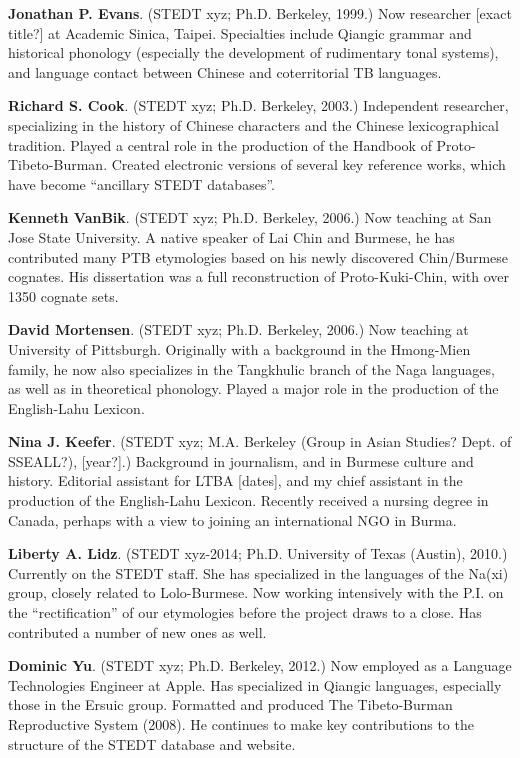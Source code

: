 \textbf{Jonathan P. Evans}. (STEDT xyz; Ph.D. Berkeley, 1999.) Now researcher [exact title?] at Academic Sinica, Taipei. Specialties include Qiangic grammar and historical phonology (especially the development of rudimentary tonal systems), and language contact between Chinese and coterritorial TB languages.

\textbf{Richard S. Cook}. (STEDT xyz; Ph.D. Berkeley, 2003.) Independent researcher, specializing in the history of Chinese characters and the Chinese lexicographical tradition. Played a central role in the production of the Handbook of Proto-Tibeto-Burman. Created electronic versions of several key reference works, which have become “ancillary STEDT databases”.

\textbf{Kenneth VanBik}. (STEDT xyz; Ph.D. Berkeley, 2006.) Now teaching at San Jose State University. A native speaker of Lai Chin and Burmese, he has contributed many PTB etymologies based on his newly discovered Chin/Burmese cognates. His dissertation was a full reconstruction of Proto-Kuki-Chin, with over 1350 cognate sets.

\textbf{David Mortensen}. (STEDT xyz; Ph.D. Berkeley, 2006.) Now teaching at University of Pittsburgh. Originally with a background in the Hmong-Mien family, he now also specializes in the Tangkhulic branch of the Naga languages, as well as in theoretical phonology. Played a major role in the production of the English-Lahu Lexicon.

\textbf{Nina J. Keefer}. (STEDT xyz; M.A. Berkeley (Group in Asian Studies? Dept. of SSEALL?), [year?].) Background in journalism, and in Burmese culture and history. Editorial assistant for LTBA [dates], and my chief assistant in the production of the English-Lahu Lexicon. Recently received a nursing degree in Canada, perhaps with a view to joining an international NGO in Burma.

\textbf{Liberty A. Lidz}. (STEDT xyz-2014; Ph.D. University of Texas (Austin), 2010.) Currently on the STEDT staff. She has specialized in the languages of the Na(xi) group, closely related to Lolo-Burmese. Now working intensively with the P.I. on the “rectification” of our etymologies before the project draws to a close. Has contributed a number of new ones as well.

\textbf{Dominic Yu}. (STEDT xyz; Ph.D. Berkeley, 2012.) Now employed as a Language Technologies Engineer at Apple. Has specialized in Qiangic languages, especially those in the Ersuic group. Formatted and produced The Tibeto-Burman Reproductive System (2008). He continues to make key contributions to the structure of the STEDT database and website.

